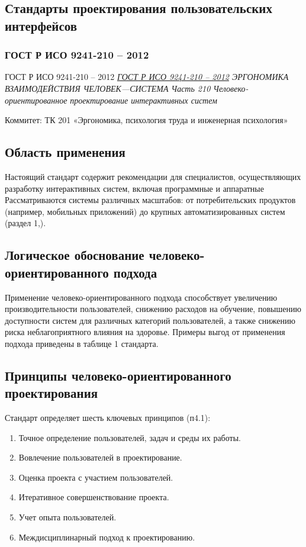 \subsection{Стандарты проектирования пользовательских интерфейсов}

\subsubsection{ГОСТ Р ИСО 9241-210 -- 2012}

ГОСТ Р ИСО 9241-210 -- 2012
\emph{\href{https://meganorm.ru/Data/534/53476.pdf}{ГОСТ Р ИСО 9241-210 -- 2012}
ЭРГОНОМИКА ВЗАИМОДЕЙСТВИЯ
ЧЕЛОВЕК—СИСТЕМА
Часть 210
Человеко-ориентированное проектирование
интерактивных систем
}
\par
Коммитет:  ТК 201 «Эргономика, психология труда и инженерная психология»


\subsection*{Область применения}
Настоящий стандарт содержит рекомендации для специалистов, осуществляющих разработку интерактивных систем, включая программные и аппаратные
Рассматриваются системы различных масштабов: от потребительских продуктов (например, мобильных приложений) до крупных автоматизированных систем (раздел 1,).

\subsection*{Логическое обоснование человеко-ориентированного подхода}
Применение человеко-ориентированного подхода способствует увеличению производительности пользователей, снижению расходов
на обучение, повышению доступности систем для различных категорий пользователей, а также снижению риска неблагоприятного влияния на здоровье.
Примеры выгод от применения подхода приведены в таблице 1 стандарта.

\subsection*{Принципы человеко-ориентированного проектирования}
Стандарт определяет шесть ключевых принципов (п4.1):
\begin{enumerate}
    \item Точное определение пользователей, задач и среды их работы.
    \item Вовлечение пользователей в проектирование.
    \item Оценка проекта с участием пользователей.
    \item Итеративное совершенствование проекта.
    \item Учет опыта пользователей.
    \item Междисциплинарный подход к проектированию.
\end{enumerate}

